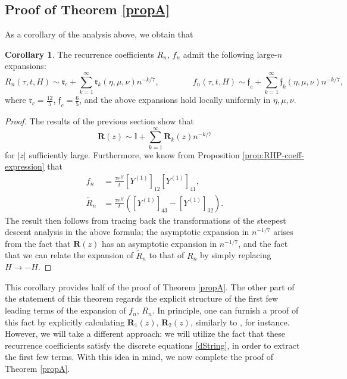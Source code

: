 \documentclass[usenames,dvipsnames]{article}
\theoremstyle{definition}
\newtheorem{cor}{Corollary}[section]
\numberwithin{equation}{section}
\numberwithin{figure}{section}
\begin{document}
\subsection{Proof of Theorem \ref{propA}}
As a corollary of the analysis above, we obtain that
\begin{cor}
    The recurrence coefficients $R_n$, $f_n$ admit the following large-$n$ expansions:
    \begin{equation}\label{R-f-expansion}
        R_n(\tau,t,H) \sim \mathfrak{r}_c + \sum_{k=1}^{\infty} \mathfrak{r}_{k}(\eta,\mu,\nu)n^{-k/7},\qquad\qquad f_n(\tau,t,H) \sim \mathfrak{f}_c + \sum_{k=1}^{\infty} \mathfrak{f}_{k}(\eta,\mu,\nu)n^{-k/7},
    \end{equation}
where $\mathfrak{r}_c = \frac{12}{5}$, $\mathfrak{f}_c = \frac{6}{5}$, and the above expansions hold locally uniformly in $\eta,\mu,\nu$.
\end{cor}
\begin{proof}
    The results of the previous section show that
        \begin{equation}
            \boldsymbol{R}(z) \sim \mathbb{I} + \sum_{k=1}^{\infty} \boldsymbol{R}_k(z) n^{-k/7}
        \end{equation}
    for $|z|$ sufficiently large. Furthermore, we know from Proposition \ref{prop:RHP-coeff-expression} that
            \begin{align*}
                f_n &= \frac{\tau e^{H}}{t} [Y^{(1)}]_{12}[Y^{(1)}]_{41},\\
                \tilde{R}_n &= \frac{\tau e^{H}}{t}\left([Y^{(1)}]_{43} - [Y^{(1)}]_{32}\right).
            \end{align*}
    The result then follows from tracing back the transformations of the steepest descent analysis in the above formula; the asymptotic expansion in $n^{-1/7}$ arises from the fact that $\boldsymbol{R}(z)$ has an asymptotic expansion in $n^{-1/7}$, and the fact that we can relate the expansion of $\tilde{R}_n$ to that of $R_n$ by simply replacing $H\to -H$.
\end{proof}
This corollary provides half of the proof of Theorem \ref{propA}. The other part of the statement of this theorem regards the explicit structure of the first few leading terms of the expansion of $f_n$, $R_n$. In principle, one can furnish a proof of this fact by explicitly calculating $\boldsymbol{R}_1(z)$,
$\boldsymbol{R}_2(z)$, similarly to \cite{DK0}, for instance. However, we will take a different approach: we will utilize the fact that these recurrence coefficients satisfy the discrete equations \eqref{dString}, in order to extract the first few terms. With this idea in mind, we now complete the proof of Theorem \ref{propA}.
\end{document}
